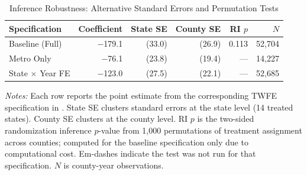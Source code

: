 \begin{table}[ht]
\centering
\begin{tabular}{lrrrrr}
  \toprule
Specification & Coefficient & State SE & County SE & RI $p$ & $N$ \\
  \midrule
Baseline (Full) & $-$179.1 & (33.0) & (26.9) & 0.113 & 52,704 \\
  Metro Only & $-$76.1 & (23.8) & (19.4) & --- & 14,227 \\
  State $\times$ Year FE & $-$123.0 & (27.5) & (22.1) & --- & 52,685 \\
   \bottomrule
\end{tabular}
\caption{Inference Robustness: Alternative Standard Errors and Permutation Tests}
\label{tab:inference}
\begin{minipage}{\textwidth}
\vspace{0.5em}
\small \textit{Notes:} Each row reports the point estimate from the corresponding TWFE specification in . State SE clusters standard errors at the state level (14 treated states). County SE clusters at the county level. RI $p$ is the two-sided randomization inference $p$-value from 1,000 permutations of treatment assignment across counties; computed for the baseline specification only due to computational cost. Em-dashes indicate the test was not run for that specification. $N$ is county-year observations.
\end{minipage}
\end{table}
